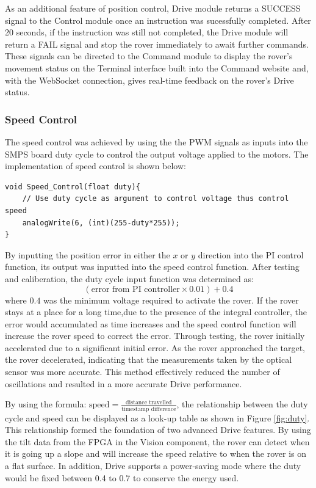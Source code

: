 \documentclass[11pt, a4paper]{article}
\begin{document}
As an additional feature of position control, Drive module returns a SUCCESS signal to the Control module once an instruction was sucessfully completed. After 20 seconds, if the instruction was still not completed, the Drive module will return a FAIL signal and stop the rover immediately to await further commands. These signals can be directed to the Command module to display the rover's movement status on the Terminal interface built into the Command website and, with the WebSocket connection, gives real-time feedback on the rover's Drive status.  

\subsubsection{Speed Control}

The speed control was achieved by using the the PWM signals as inputs into the SMPS board duty cycle to control the output voltage applied to the motors. The implementation of speed control is shown below:

\begin{lstlisting}
void Speed_Control(float duty){
    // Use duty cycle as argument to control voltage thus control speed
    analogWrite(6, (int)(255-duty*255)); 
}
\end{lstlisting}

By inputting the position error in either the $x$ or $y$ direction into the PI control function, its output was  inputted into the speed control function. After testing and caliberation, the duty cycle input function was determined as:
$$
    (\text{error from PI controller} \times 0.01) + 0.4
$$
where $0.4$ was the minimum voltage required to activate the rover. If the rover stays at a place for a long time,due to the presence of the integral controller, the error would accumulated as time increases and the speed control function will increase the rover speed to correct the error. Through testing, the rover initially accelerated due to a significant initial error. As the rover approached the target, the rover decelerated, indicating that the measurements taken by the optical sensor was more accurate. This method effectively reduced the number of oscillations and resulted in a more accurate Drive performance.

By using the formula: $\text{speed} = \frac{\text{distance travelled}}{\text{timestamp difference}}$, the relationship between the duty cycle and speed can be displayed as a look-up table as shown in Figure \ref{fig:duty}. This relationship formed the foundation of two advanced Drive features. By using the tilt data from the FPGA in the Vision component, the rover can detect when it is going up a slope and will increase the speed relative to when the rover is on a flat surface. In addition, Drive supports a power-saving mode where the duty would be fixed between 0.4 to 0.7 to conserve the energy used.
\end{document}
